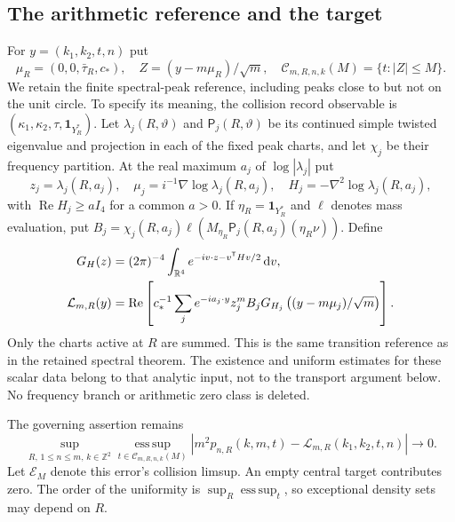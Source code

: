\documentclass[11pt,reqno]{amsart}
\numberwithin{equation}{section}
\theoremstyle{definition}
\theoremstyle{remark}\newtheorem{remark}[theorem]{Remark}
\newcommand{\R}{\mathbb R}\newcommand{\Z}{\mathbb Z}
\newcommand{\one}{\mathbf1}\newcommand{\dd}{\,\mathrm d}
\newcommand{\esssup}{\operatorname*{ess\,sup}}
\begin{document}
\subsection{The arithmetic reference and the target}
For $y=(k_1,k_2,t,n)$ put
\[
 \mu_R=(0,0,\bar\tau_R,c_*),\quad
 Z=(y-m\mu_R)/\sqrt m,\quad
 \mathcal C_{m,R,n,k}(M)=\{t:|Z|\le M\}.
\]
We retain the finite spectral-peak reference, including peaks close to
but not on the unit circle. To specify its meaning, the collision
record observable is $(\kappa_1,\kappa_2,\tau,\one_{Y_R^*})$.
Let $\lambda_j(R,\vartheta)$ and $\mathsf P_j(R,\vartheta)$ be its
continued simple twisted eigenvalue and projection in each of the
fixed peak charts, and let $\chi_j$ be their frequency partition.
At the real maximum $a_j$ of $\log|\lambda_j|$ put
\[
 z_j=\lambda_j(R,a_j),\quad
 \mu_j=i^{-1}\nabla\log\lambda_j(R,a_j),\quad
 H_j=-\nabla^2\log\lambda_j(R,a_j),
\]
with $\operatorname{Re}H_j\ge aI_4$ for a common $a>0$. If
$\eta_R=\one_{Y_R^*}$ and $\ell$ denotes mass evaluation, put
$B_j=\chi_j(R,a_j)\ell(M_{\eta_R}\mathsf P_j(R,a_j)(\eta_R\nu))$.
Define
\begin{align}
 G_H(z)&=(2\pi)^{-4}\int_{\R^4}e^{-iv\cdot z-v^{\mathsf T}Hv/2}\dd v,
 \notag\\
 \mathcal L_{m,R}(y)&=\operatorname{Re}\left[
 c_*^{-1}\sum_j e^{-ia_j\cdot y}z_j^m B_j
      G_{H_j}\left((y-m\mu_j)/\sqrt m\right)\right].
 \label{eq:v76-reference}
\end{align}
Only the charts active at $R$ are summed. This is the same transition
reference as in the retained spectral theorem. The existence and
uniform estimates for these scalar data belong to that analytic
input, not to the transport argument below. No frequency branch or
arithmetic zero class is deleted.

The governing assertion remains
\begin{equation}\label{eq:v76-target}
 \sup_{R,\,1\le n\le m,\,k\in\Z^2}
 \esssup_{t\in\mathcal C_{m,R,n,k}(M)}
 |m^2p_{n,R}(k,m,t)-\mathcal L_{m,R}(k_1,k_2,t,n)|\longrightarrow0.
\end{equation}
Let $\mathcal E_M$ denote this error's collision limsup. An empty
central target contributes zero. The order of the uniformity is
$\sup_R\esssup_t$, so exceptional density sets may depend on $R$.
\end{document}

